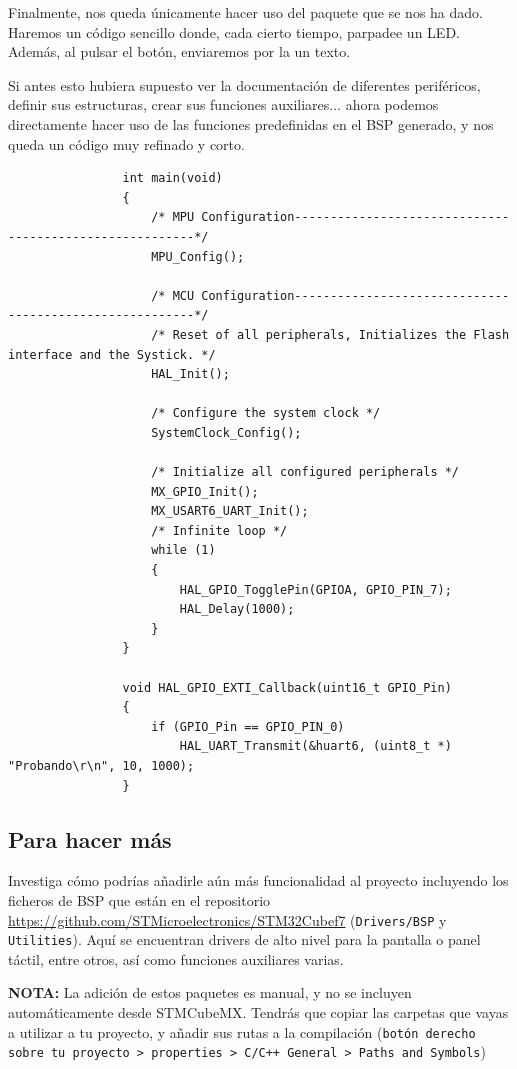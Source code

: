 \documentclass[../main.tex]{subfiles}
\begin{document}
            Finalmente, nos queda únicamente hacer uso del paquete que se nos ha dado. Haremos un código sencillo donde, cada cierto tiempo, parpadee un LED. Además, al pulsar el botón, enviaremos por la  un texto.

            Si antes esto hubiera supuesto ver la documentación de diferentes periféricos, definir sus estructuras, crear sus funciones auxiliares... ahora podemos directamente hacer uso de las funciones predefinidas en el BSP generado, y nos queda un código muy refinado y corto.

            \begin{lstlisting}
                int main(void)
                {
                    /* MPU Configuration--------------------------------------------------------*/
                    MPU_Config();

                    /* MCU Configuration--------------------------------------------------------*/
                    /* Reset of all peripherals, Initializes the Flash interface and the Systick. */
                    HAL_Init();

                    /* Configure the system clock */
                    SystemClock_Config();

                    /* Initialize all configured peripherals */
                    MX_GPIO_Init();
                    MX_USART6_UART_Init();
                    /* Infinite loop */
                    while (1)
                    {
                        HAL_GPIO_TogglePin(GPIOA, GPIO_PIN_7);
                        HAL_Delay(1000);
                    }
                }

                void HAL_GPIO_EXTI_Callback(uint16_t GPIO_Pin)
                {
                    if (GPIO_Pin == GPIO_PIN_0)
                        HAL_UART_Transmit(&huart6, (uint8_t *) "Probando\r\n", 10, 1000);
                }
            \end{lstlisting}
            
    
    \subsection{Para hacer más}

        Investiga cómo podrías añadirle aún más funcionalidad al proyecto incluyendo los ficheros de BSP que están en el repositorio \url{https://github.com/STMicroelectronics/STM32Cubef7} (\texttt{Drivers/BSP} y \texttt{Utilities}). Aquí se encuentran drivers de alto nivel para la pantalla o panel táctil, entre otros, así como funciones auxiliares varias.

        \textbf{NOTA:} La adición de estos paquetes es manual, y no se incluyen automáticamente desde STMCubeMX. Tendrás que copiar las carpetas que vayas a utilizar a tu proyecto, y añadir sus rutas a la compilación (\texttt{botón derecho sobre tu proyecto > properties > C/C++ General > Paths and Symbols})

            
\end{document}
